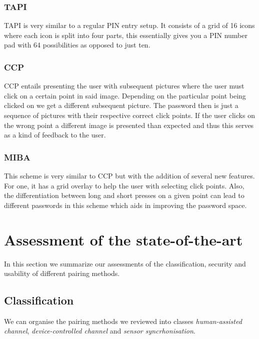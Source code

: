 \documentclass[conference, 11pt]{sty/IEEEtran}
\begin{document}
\subsubsection{TAPI}
\label{sssec:tapi}

TAPI is very similar to a regular PIN entry setup.
It consists of a grid of 16 icons where each icon is split into four parts, this essentially gives you a PIN number pad with 64 possibilities as opposed to just ten.

\subsubsection{CCP}
\label{sssec:ccp}

CCP entails presenting the user with subsequent pictures where the user must click on a certain point in said image.
Depending on the particular point being clicked on we get a different subsequent picture.
The password then is just a sequence of pictures with their respective correct click points.
If the user clicks on the wrong point a different image is presented than expected and thus this serves as a kind of feedback to the user.

\subsubsection{MIBA}
\label{sssec:miba}

This scheme is very similar to CCP but with the addition of several new features.
For one, it has a grid overlay to help the user with selecting click points.
Also, the differentiation between long and short presses on a given point can lead to different passwords in this scheme which aids in improving the password space.

\section{Assessment of the state-of-the-art}
\label{sec:assessment_of_the_state_of_the_art}
In this section we summarize our assessments of the classification, security and usability of different pairing methods.

\subsection{Classification}
We can organise the pairing methods we reviewed into classes \emph{human-assisted channel}, \emph{device-controlled channel} and \emph{sensor syncrhonisation}.
\end{document}
